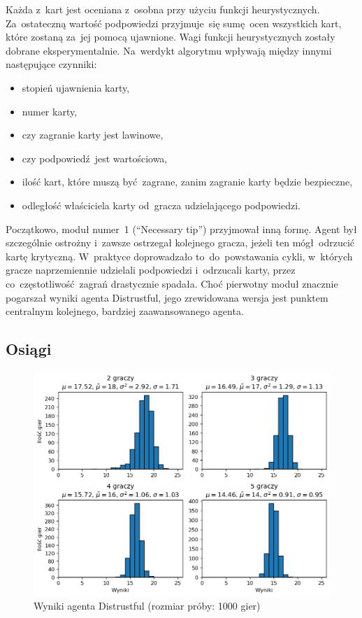 \documentclass[declaration,shortabstract,inz]{iithesis}
\begin{document}
Każda z~kart jest oceniana z~osobna przy użyciu funkcji heurystycznych. Za~ostateczną wartość podpowiedzi przyjmuje~się sumę ocen wszystkich kart, które zostaną za~jej pomocą ujawnione. Wagi funkcji heurystycznych zostały dobrane eksperymentalnie. Na~werdykt algorytmu wpływają między innymi następujące czynniki:
\begin{itemize}
	\item stopień ujawnienia karty,
	\item numer karty,
	\item czy zagranie karty jest lawinowe,
	\item czy podpowiedź jest wartościowa,
	\item ilość kart, które muszą być zagrane, zanim zagranie karty będzie bezpieczne,
	\item odległość właściciela karty od~gracza udzielającego podpowiedzi.
\end{itemize}

Początkowo, moduł numer~1 (``Necessary tip'') przyjmował inną formę. Agent był szczególnie ostrożny i~zawsze ostrzegał kolejnego gracza, jeżeli ten mógł odrzucić kartę krytyczną. W~praktyce doprowadzało to~do~powstawania cykli, w~których gracze naprzemiennie udzielali podpowiedzi i~odrzucali karty, przez co~częstotliwość zagrań drastycznie spadała. Choć pierwotny moduł znacznie pogarszał wyniki agenta Distrustful, jego zrewidowana wersja jest punktem centralnym kolejnego, bardziej zaawansowanego agenta.

\subsection*{Osiągi}

\begin{figure}[H]
	\centering
	\captionsetup{format=hang}
	\includegraphics[width=\textwidth,height=\textheight,keepaspectratio]{Distrustful.png}
	\caption[Caption]{Wyniki agenta Distrustful (rozmiar próby: 1000 gier)}
	\label{fig:Distrustful}
\end{figure}
\end{document}
